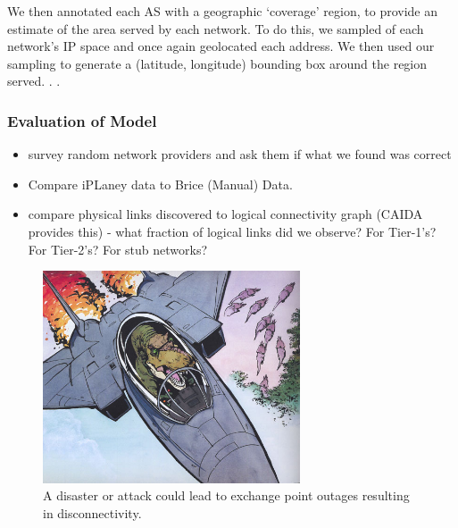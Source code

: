     We then annotated each AS with a geographic `coverage' region, to provide
an estimate of the area served by each network. 
    To do this, we sampled  of each network's IP space and
once again geolocated each address. 
    We then used our sampling to generate a (latitude, longitude) bounding box
around the region served.    
    .
    .
 
        \subsubsection*{Evaluation of Model}
            \begin{itemize}
        \item survey random network providers and ask them if what we
        found was correct
        \item Compare iPLaney data to Brice (Manual) Data.
        \item compare physical links discovered to logical connectivity
        graph (CAIDA provides this) - what fraction of logical links
        did we observe? For Tier-1's? For Tier-2's? For stub networks?
            \end{itemize} 

\begin{figure}[tb]
\centering
\includegraphics[width=3in]{illustration.jpg}
\caption[]{A disaster or attack could lead to exchange point outages resulting
in disconnectivity.} 
\end{figure}


